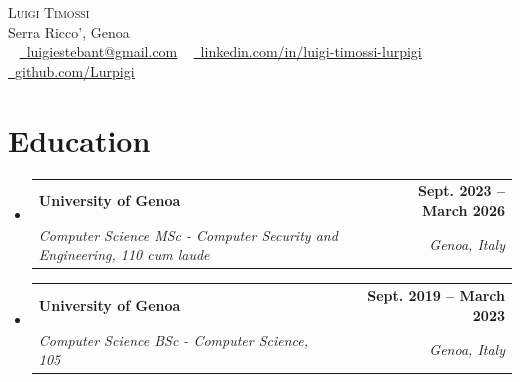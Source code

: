 \documentclass[letterpaper,11pt]{article}
\makeatletter
\newcommand{\resumeSubheading}[4]{
  \vspace{-2pt}\item
    \begin{tabular*}{1.0\textwidth}[t]{l@{\extracolsep{\fill}}r}
      \textbf{#1} & \textbf{\small #2} \\
      \textit{\small#3} & \textit{\small #4} \\
    \end{tabular*}\vspace{-7pt}
}
\newcommand{\resumeSubHeadingListStart}{\begin{itemize}[leftmargin=0.0in, label={}]}
\newcommand{\resumeSubHeadingListEnd}{\end{itemize}}
\makeatother
\begin{document}


\begin{center}
    {\Huge \scshape Luigi Timossi} \\ \vspace{1pt}
    Serra Ricco', Genoa \\ \vspace{1pt}
    \small \raisebox{-0.1\height}  ~ \href{mailto:luigiestebant@gmail.com}{\raisebox{-0.2\height}\faEnvelope\  \underline{luigiestebant@gmail.com}} ~ 
    \href{https://www.linkedin.com/in/luigi-timossi-lurpigi/}{\raisebox{-0.2\height}\faLinkedin\ \underline{linkedin.com/in/luigi-timossi-lurpigi}}  ~
    \href{https://github.com/Lurpigi}{\raisebox{-0.2\height}\faGithub\ \underline{github.com/Lurpigi}}
    \vspace{-8pt}
\end{center}


\section{Education}
  \resumeSubHeadingListStart
    \resumeSubheading
      {University of Genoa}{Sept. 2023 -- March 2026}
      {Computer Science MSc - Computer Security and Engineering, 110 cum laude}{Genoa, Italy}
    \resumeSubheading
      {University of Genoa}{Sept. 2019 -- March 2023}
      {Computer Science BSc - Computer Science, 105}{Genoa, Italy}
  \resumeSubHeadingListEnd

\end{document}
